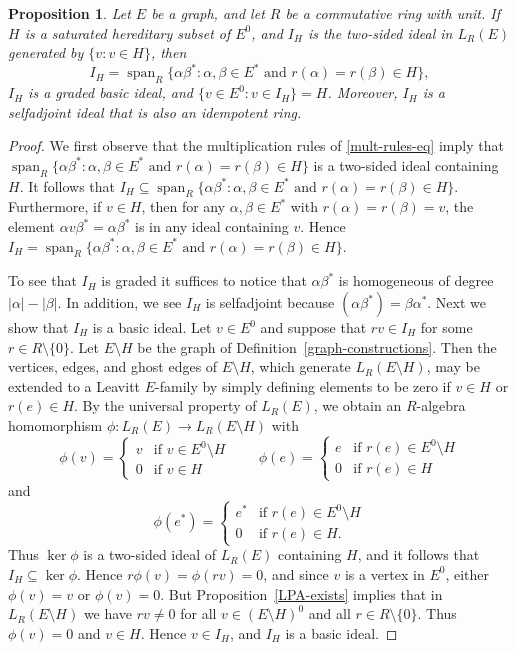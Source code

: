 \documentclass[11pt]{amsart}
\newtheorem{proposition}[theorem]{Proposition}
\theoremstyle{remark}
\numberwithin{equation}{section}
\newcommand{\algspan}{\operatorname{span}}
\begin{document}
\begin{proposition} \label{I-H-facts}
Let $E$ be a graph, and let $R$ be a commutative ring with unit.  If $H$ is a saturated hereditary subset of $E^0$, and $I_H$ is the two-sided ideal in $L_R(E)$ generated by $\{ v : v \in H \}$, then $$I_H = \algspan_R \{ \alpha \beta^* : \alpha, \beta \in E^* \text{ and } r(\alpha) = r(\beta) \in H \},$$ $I_H$ is a graded basic ideal, and $\{ v \in E^0 : v \in I_H \} = H$.  Moreover, $I_H$ is a selfadjoint ideal that is also an idempotent ring.  
\end{proposition}

\begin{proof}
We first observe that the multiplication rules of \eqref{mult-rules-eq} imply that $\algspan_R \{ \alpha \beta^* :  \alpha, \beta \in E^* \text{ and } r(\alpha) = r(\beta) \in H \}$ is a two-sided ideal containing $H$.  It follows that $I_H \subseteq \algspan_R \{ \alpha \beta^* :  \alpha, \beta \in E^* \text{ and } r(\alpha) = r(\beta) \in H \}$.  Furthermore, if $v \in H$, then for any $\alpha, \beta \in E^*$ with $r(\alpha)=r(\beta)=v$, the element $\alpha v \beta^* = \alpha \beta^*$ is in any ideal containing $v$.  Hence $I_H = \algspan_R \{ \alpha \beta^* : \alpha, \beta \in E^* \text{ and } r(\alpha) = r(\beta) \in H \}$.

To see that $I_H$ is graded it suffices to notice that $\alpha \beta^*$ is homogeneous of degree $|\alpha|-|\beta|$.  In addition, we see $I_H$ is selfadjoint because $(\alpha\beta^*) = \beta \alpha^*$.  Next we show that $I_H$ is a basic ideal.  Let $v \in E^0$ and suppose that $rv \in I_H$ for some $r \in R \setminus \{ 0 \}$.  Let $E \setminus H$ be the graph of Definition~\ref{graph-constructions}.  Then the vertices, edges, and ghost edges of $E \setminus H$, which generate $L_R(E \setminus H)$, may be extended to a Leavitt $E$-family by simply defining elements to be zero if $v \in H$ or $r(e) \in H$.  By the universal property of $L_R(E)$, we obtain an $R$-algebra homomorphism $\phi : L_R(E) \to L_R (E \setminus H)$ with $$\phi (v) = \begin{cases} v & \text{if $v \in E^0 \setminus H$} \\ 0 & \text{if $v \in H$} \end{cases} \qquad \phi (e) = \begin{cases} e & \text{if $r(e) \in E^0 \setminus H$} \\ 0 & \text{if $r(e) \in H$} \end{cases}$$ and $$\phi (e^*) = \begin{cases} e^* & \text{if $r(e) \in E^0 \setminus H$} \\ 0 & \text{if $r(e) \in H$.} \end{cases}$$
Thus $\ker \phi$ is a two-sided ideal of $L_R(E)$ containing $H$, and it follows that $I_H \subseteq \ker \phi$.  Hence $r \phi(v) = \phi (rv) = 0$, and since $v$ is a vertex in $E^0$, either $\phi(v) = v$ or $\phi( v ) = 0$.  But Proposition~\ref{LPA-exists} implies that in $L_R(E \setminus H)$ we have $rv \neq 0$ for all $v \in (E \setminus H)^0$ and all $r \in R \setminus \{ 0 \}$.  Thus $\phi( v ) = 0$ and $v \in H$. Hence $v \in I_H$, and $I_H$ is a basic ideal.


\end{proof}
\end{document}
